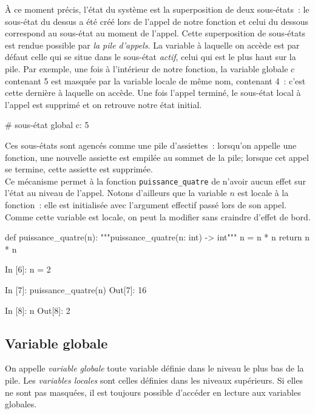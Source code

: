\documentclass{magnolia}
\begin{document}
\noindent À ce moment précis, l'état du système est la superposition de deux sous-états~:
le sous-état du dessus a été créé lors de l'appel de notre fonction et celui du dessous
correspond au sous-état au moment de l'appel.
Cette superposition de sous-états est rendue possible par \emph{la pile d'appels}.
La variable à laquelle on accède est par défaut celle qui se situe dans le sous-état \emph{actif},
celui qui est le plus haut sur la pile. Par exemple, une fois à l'intérieur de notre fonction, la variable globale $c$ contenant
5 est masquée par la variable locale de même nom, contenant 4~: c'est cette dernière à laquelle
on accède. Une fois l'appel 
terminé, le sous-état local à l'appel est supprimé et on retrouve notre état initial.

\begin{pythoncode}
# sous-état global          {c: 5}
\end{pythoncode}

\noindent Ces sous-états sont agencés comme une pile d'assiettes~: lorsqu'on appelle une
fonction, une nouvelle \og assiette \fg est empilée au sommet de la pile; lorsque
cet appel se termine, cette assiette est supprimée.\\

Ce mécanisme permet à la fonction \verb+puissance_quatre+ de n'avoir aucun effet
sur l'état au niveau de l'appel.
Notons d'ailleurs que la variable $n$ est locale à la fonction~: elle est initialisée
avec l'argument effectif passé lors de son appel. Comme cette variable est locale,
on peut la modifier sans craindre d'effet de bord.

\begin{pythoncodeline}
def puissance_quatre(n):
    """puissance_quatre(n: int) -> int"""
    n = n * n
    return n * n
\end{pythoncodeline}

\begin{pythoncode}
In [6]: n = 2

In [7]: puissance_quatre(n)
Out[7]: 16

In [8]: n
Out[8]: 2
\end{pythoncode}

\subsection{Variable globale}

On appelle \emph{variable globale} toute variable définie dans le niveau le plus bas de la pile. Les \emph{variables locales} sont celles définies dans les niveaux supérieurs.
Si elles ne sont pas masquées, il est toujours possible d'accéder en lecture aux variables globales.
\end{document}
